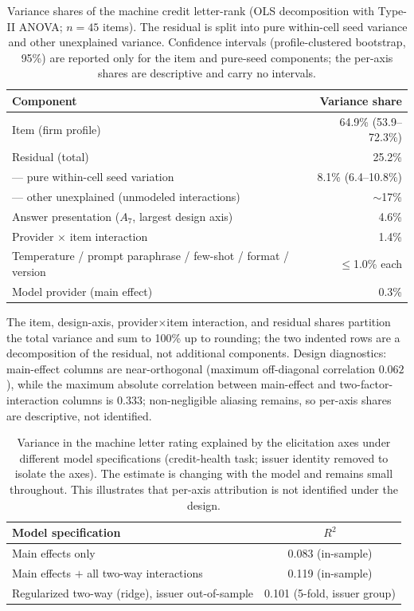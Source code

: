 \documentclass[a4paper,fleqn]{cas-sc}
\begin{document}
\begin{table}[t]\centering
\caption{Variance shares of the machine credit letter-rank (OLS decomposition with Type-II ANOVA;
$n=45$ items). The residual is split into pure within-cell seed variance and other unexplained variance.
Confidence intervals (profile-clustered bootstrap, 95\%) are reported only for the item and pure-seed components; the per-axis shares are descriptive and carry no intervals.}\label{tab:var}
\begin{tabular}{lr}\toprule
Component & Variance share \\\midrule
Item (firm profile) & 64.9\% (53.9--72.3\%) \\
Residual (total) & 25.2\% \\
\quad --- pure within-cell seed variation & 8.1\% (6.4--10.8\%) \\
\quad --- other unexplained (unmodeled interactions) & $\sim$17\% \\
Answer presentation ($A_7$, largest design axis) & 4.6\% \\
Provider $\times$ item interaction & 1.4\% \\
Temperature / prompt paraphrase / few-shot / format / version & $\le$1.0\% each \\
Model provider (main effect) & 0.3\% \\\bottomrule
\end{tabular}

\vspace{3pt}
{\footnotesize\raggedright The item, design-axis, provider$\times$item interaction, and residual shares
partition the total variance and sum to 100\% up to rounding; the two indented rows are a decomposition
of the residual, not additional components. Design diagnostics: main-effect columns are near-orthogonal
(maximum off-diagonal correlation $0.062$), while the maximum absolute correlation between main-effect and
two-factor-interaction columns is $0.333$; non-negligible aliasing remains, so per-axis shares are
descriptive, not identified.}
\end{table}

\begin{table}[t]\centering
\caption{Variance in the machine letter rating explained by the elicitation axes under different model
specifications (credit-health task; issuer identity removed to isolate the axes). The estimate is changing
with the model and remains small throughout. This illustrates that per-axis attribution is not identified under the design.}
\label{tab:varrange}
\begin{tabular}{lc}\toprule
Model specification & $R^2$ \\\midrule
Main effects only & 0.083 (in-sample) \\
Main effects $+$ all two-way interactions & 0.119 (in-sample) \\
Regularized two-way (ridge), issuer out-of-sample & 0.101 (5-fold, issuer group) \\\bottomrule
\end{tabular}\end{table}
\end{document}
